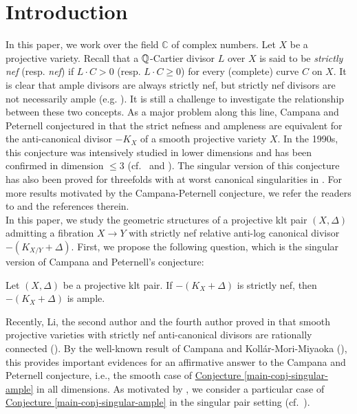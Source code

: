\section{Introduction}
\label{sec_intro}

In this paper, we work over the field  $\mathbb{C}$ of complex numbers. 
Let $X$ be a projective variety.  
Recall that a $\mathbb Q$-Cartier divisor $L$ over $X$ is said to be \emph{strictly nef} (resp. \emph{nef}) if  $L\cdot C>0$ (resp. $L\cdot C\geqslant 0$) for every (complete) curve $C$ on $X$. 
It is clear that ample divisors are always strictly nef, but strictly nef divisors are not necessarily ample (e.g. \cite[Example 10.6]{Har70}). It is still a challenge to
investigate the relationship between these two concepts.  As a major problem along this line,  Campana and Peternell conjectured
in \cite{CP91} that the  strict nefness and ampleness are equivalent for the anti-canonical divisor $-K_X$ of a smooth projective variety $X$.
In the 1990s, this conjecture was intensively studied in lower dimensions and has been confirmed in dimension $\leqslant 3$ (cf.~\cite{Mae93} and \cite{Ser95}).
The singular version of this conjecture has also been proved for threefolds with at worst canonical singularities in \cite[Theorem 3.9]{Ueh00}. For more results motivated by the Campana-Peternell conjecture, we  refer the readers to \cite{CCP08, LOY19, LOY20, LOY21}   and the references therein.\\

In this paper, we  study the geometric structures of a projective klt pair $(X,\Delta)$ admitting a fibration $X\to Y$ with strictly nef  relative anti-log canonical divisor $-(K_{X/Y}+\Delta)$. 
First, we propose the following question, which is the singular version of Campana and Peternell's conjecture:



\begin{conj}\label{main-conj-singular-ample}
Let $(X,\Delta)$ be a projective klt pair.
If $-(K_X+\Delta)$ is strictly nef, 
then $-(K_X+\Delta)$ is  ample.
\end{conj}

\noindent 
Recently, Li, the second author and the fourth author proved in \cite{LOY19} that  smooth projective varieties with strictly nef   anti-canonical divisors  are rationally connected (\cite[Theorems 1.2 and 1.3]{LOY19}). By the well-known result of Campana and  Koll\'ar-Mori-Miyaoka (\cite{Cam92,KoMM92}),  this provides important evidences for an affirmative answer to the Campana and Peternell conjecture, i.e.,  the smooth case of {\hyperref[main-conj-singular-ample]{Conjecture \ref*{main-conj-singular-ample}}} in all dimensions.
As motivated by  \cite[Theorem 1.3]{LOY19}, we consider a particular case of {\hyperref[main-conj-singular-ample]{Conjecture \ref*{main-conj-singular-ample}}} in the singular pair setting (cf.~\cite{Zhang06}). 

